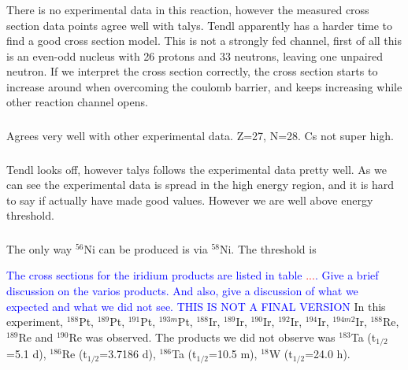 \documentclass[a4paper,11pt,twoside]{book}
\begin{document}
\subsubsection{}
There is no experimental data in this reaction, however the measured cross section data points agree well with talys. Tendl apparently has a harder time to find a good cross section model. This is not a strongly fed channel, first of all this is an even-odd nucleus with 26 protons and 33 neutrons, leaving one unpaired neutron. If we interpret the cross section correctly, the cross section starts to increase around when overcoming the coulomb barrier, and keeps increasing while other reaction channel opens. 

\subsubsection{}

Agrees very well with other experimental data. Z=27, N=28. Cs not super high. 

\subsubsection{}
Tendl looks off, however talys follows the experimental data pretty well. As we can see the experimental data is spread in the high energy region, and it is hard to say if actually have made good values. However we are well above energy threshold. 

\subsubsection{}
The only way $^{56}$Ni can be produced is via $^{58}$Ni. The threshold is 



\newpage


\noindent \textcolor{blue}{The cross sections for the iridium products are listed in table \textcolor{red}{...}. Give a brief discussion on the varios products. And also, give a discussion of what we expected and what we did not see. THIS IS NOT A FINAL VERSION } In this experiment, $^{188}$Pt, $^{189}$Pt, $^{191}$Pt, $^{193m}$Pt, $^{188}$Ir, $^{189}$Ir, $^{190}$Ir, $^{192}$Ir, $^{194}$Ir, $^{194m2}$Ir, $^{188}$Re, $^{189}$Re and $^{190}$Re was observed. The products we did not observe was $^{183}$Ta (t$_{1/2}$=5.1 d), $^{186}$Re (t$_{1/2}$=3.7186 d), $^{186}$Ta (t$_{1/2}$=10.5 m), $^{18}$W (t$_{1/2}$=24.0 h). \\
\end{document}
